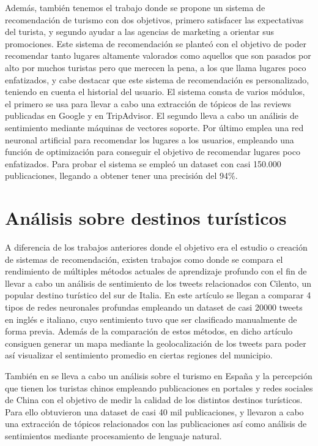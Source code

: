 Además, también tenemos el trabajo \cite{recom_mech_under_emph} donde se propone un sistema de recomendación de turismo con dos objetivos, primero satisfacer las expectativas del turista, y segundo ayudar a las agencias de marketing a orientar sus promociones. Este sistema de recomendación se planteó con el objetivo de poder recomendar tanto lugares altamente valorados como aquellos que son pasados por alto por muchos turistas pero que merecen la pena, a los que llama lugares poco enfatizados, y cabe destacar que este sistema de recomendación es personalizado, teniendo en cuenta el historial del usuario. El sistema consta de varios módulos, el primero se usa para llevar a cabo una extracción de tópicos de las reviews publicadas en Google y en TripAdvisor. El segundo lleva a cabo un análisis de sentimiento mediante máquinas de vectores soporte. Por último emplea una red neuronal artificial para recomendar los lugares a los usuarios, empleando una función de optimización para conseguir el objetivo de recomendar lugares poco enfatizados. Para probar el sistema se empleó un dataset con casi 150.000 publicaciones, llegando a obtener tener una precisión del 94\%.

\section{Análisis sobre destinos turísticos}

A diferencia de los trabajos anteriores donde el objetivo era el estudio o creación de sistemas de recomendación, existen trabajos como \cite{tourism_dest_rec_geolocation} donde se compara el rendimiento de múltiples métodos actuales de aprendizaje profundo con el fin de llevar a cabo un análisis de sentimiento de los tweets relacionados con Cilento, un popular destino turístico del sur de Italia. En este artículo se llegan a comparar 4 tipos de redes neuronales profundas empleando un dataset de casi 20000 tweets en inglés e italiano, cuyo sentimiento tuvo que ser clasificado manualmente de forma previa. Además de la comparación de estos métodos, en dicho artículo consiguen generar un mapa mediante la geolocalización de los tweets para poder así visualizar el sentimiento promedio en ciertas regiones del municipio.

También en \cite{su13116015} se lleva a cabo un análisis sobre el turismo en España y la percepción que tienen los turistas chinos empleando publicaciones en portales y redes sociales de China con el objetivo de medir la calidad de los distintos destinos turísticos. Para ello obtuvieron una dataset de casi 40 mil publicaciones, y llevaron a cabo una extracción de tópicos relacionados con las publicaciones así como análisis de sentimientos mediante procesamiento de lenguaje natural.